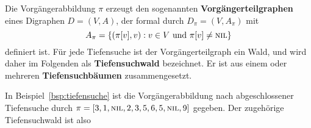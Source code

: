 \begin{defn} 
Die Vorgängerabbildung $\pi$ erzeugt den sogenannten \textbf{Vor\-gänger\-teil\-graphen} eines Digraphen $D=(V,A)$, der formal durch $D_\pi=(V,A_\pi)$ mit
\[
A_\pi = \left\{(\pi[v],v) : v \in V \text{ und } \pi[v] \neq \mathop{\text{\textsc{nil}}}\right\}
\]
definiert ist.
Für jede Tiefensuche ist der Vorgängerteilgraph ein Wald, und wird daher im Folgenden als \textbf{Tiefensuchwald} bezeichnet.
Er ist aus einem oder mehreren \textbf{Tiefensuchbäumen} zusammengesetzt.
\end{defn} 

\begin{bsp} 
In Beispiel~\ref{bsp:tiefensuche} ist die Vorgängerabbildung nach abgeschlossener Tiefensuche durch $\pi=[3,1,\mathop{\text{\textsc{nil}}},2,3,5,6,5,\mathop{\text{\textsc{nil}}},9]$ gegeben.
Der zugehörige Tiefensuchwald ist also

\begin{center} 
\end{center} 
\end{bsp} 


